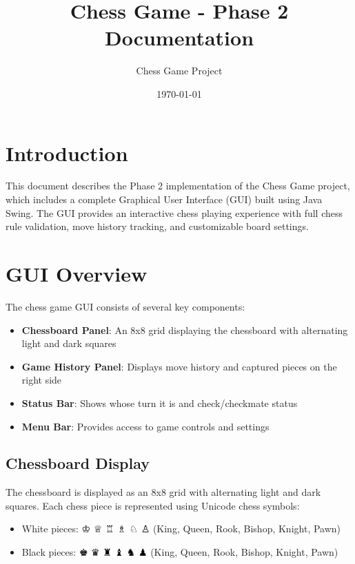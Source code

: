 \documentclass[12pt]{article}
\title{Chess Game - Phase 2 Documentation}
\author{Chess Game Project}
\date{\today}
\begin{document}
\maketitle

\section{Introduction}

This document describes the Phase 2 implementation of the Chess Game project, which includes a complete Graphical User Interface (GUI) built using Java Swing. The GUI provides an interactive chess playing experience with full chess rule validation, move history tracking, and customizable board settings.

\section{GUI Overview}

The chess game GUI consists of several key components:

\begin{itemize}
    \item \textbf{Chessboard Panel}: An 8x8 grid displaying the chessboard with alternating light and dark squares
    \item \textbf{Game History Panel}: Displays move history and captured pieces on the right side
    \item \textbf{Status Bar}: Shows whose turn it is and check/checkmate status
    \item \textbf{Menu Bar}: Provides access to game controls and settings
\end{itemize}

\subsection{Chessboard Display}

The chessboard is displayed as an 8x8 grid with alternating light and dark squares. Each chess piece is represented using Unicode chess symbols:
\begin{itemize}
    \item White pieces: \textcolor{white}{\textcolor{black}{♔ ♕ ♖ ♗ ♘ ♙}} (King, Queen, Rook, Bishop, Knight, Pawn)
    \item Black pieces: \textcolor{black}{♚ ♛ ♜ ♝ ♞ ♟} (King, Queen, Rook, Bishop, Knight, Pawn)
\end{itemize}
\end{document}
